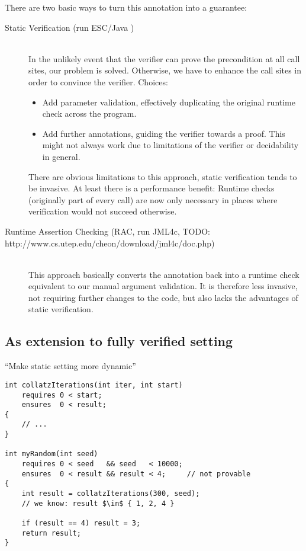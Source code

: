 There are two basic ways to turn this annotation into a guarantee:
\begin{description}
    \item[Static Verification (run ESC/Java \cite{leino2000esc})]~\\
    In the unlikely event that the verifier can prove the precondition at all call sites, our problem is solved.
    Otherwise, we have to enhance the call sites in order to convince the verifier.
    Choices:
    \begin{itemize}
        \item 
        Add parameter validation, effectively duplicating the original runtime check across the program.
        \item
        Add further annotations, guiding the verifier towards a proof.
        This might not always work due to limitations of the verifier or decidability in general.
    \end{itemize}
    There are obvious limitations to this approach, static verification tends to be invasive.
    At least there is a performance benefit: 
    Runtime checks (originally part of every call) are now only necessary in places where verification would not succeed otherwise.
    
    \item[Runtime Assertion Checking (RAC, run JML4c, TODO: http://www.cs.utep.edu/cheon/download/jml4c/doc.php)]~\\
    This approach basically converts the annotation back into a runtime check equivalent to our manual argument validation.
    It is therefore less invasive, not requiring further changes to the code, but also lacks the advantages of static verification.
\end{description}

\subsection{As extension to fully verified setting}
“Make static setting more dynamic”

\begin{lstlisting}
int collatzIterations(int iter, int start)
    requires 0 < start;
    ensures  0 < result;
{
    // ...
}

int myRandom(int seed)
    requires 0 < seed   && seed   < 10000;
    ensures  0 < result && result < 4;     // not provable
{
    int result = collatzIterations(300, seed);
    // we know: result $\in$ { 1, 2, 4 }
    
    if (result == 4) result = 3;
    return result;
}
\end{lstlisting}

